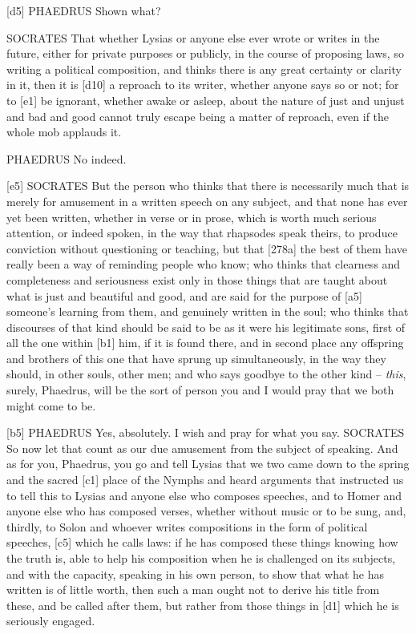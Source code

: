 {[}d5{]} PHAEDRUS Shown what?

SOCRATES That whether Lysias or anyone else ever wrote or writes in the
future, either for private purposes or publicly, in the course of
proposing laws, so writing a political composition, and thinks there is
any great certainty or clarity in it, then it is {[}d10{]} a reproach to
its writer, whether anyone says so or not; for to {[}e1{]} be ignorant,
whether awake or asleep, about the nature of just and unjust and bad and
good cannot truly escape being a matter of reproach, even if the whole
mob applauds it.

PHAEDRUS No indeed.

{[}e5{]} SOCRATES But the person who thinks that there is necessarily
much that is merely for amusement in a written speech on any subject,
and that none has ever yet been written, whether in verse or in prose,
which is worth much serious attention, or indeed spoken, in the way that
rhapsodes speak theirs,
to produce conviction without questioning or teaching, but that
{[}278a{]} the best of them have really been a way of reminding people
who know; who thinks that clearness and completeness and seriousness
exist only in those things that are taught about what is just and
beautiful and good, and are said for the purpose of {[}a5{]} someone's
learning from them, and genuinely written in the soul; who thinks that
discourses of that kind
should be said to be as it were his legitimate sons, first of all the
one within {[}b1{]} him, if it is found there, and in second place any
offspring and brothers of this one that have sprung up simultaneously,
in the way they should, in other souls, other men; and who says goodbye
to the other kind -- {\em this}, surely, Phaedrus, will be the sort of
person you and I would pray that we both might come to be.

{[}b5{]} PHAEDRUS Yes, absolutely. I wish and pray for what you say.
SOCRATES So now let that count as our due amusement from the subject of
speaking. And as for you, Phaedrus, you go and tell Lysias that we two
came down to the spring and the sacred {[}c1{]} place of the Nymphs and
heard arguments that
instructed us to tell this to Lysias and anyone else who composes
speeches, and to Homer and anyone else who has composed verses, whether
without music or to be sung, and, thirdly, to Solon and whoever writes
compositions in the form of political speeches, {[}c5{]} which he calls
laws: if he has composed these things knowing how the truth is, able to
help his composition when he is challenged on its subjects, and with the
capacity, speaking in his own person, to show that what he has written
is of little worth, then
such a man ought not to derive his title from these, and be called after
them, but rather from those things in {[}d1{]} which he is seriously
engaged.

